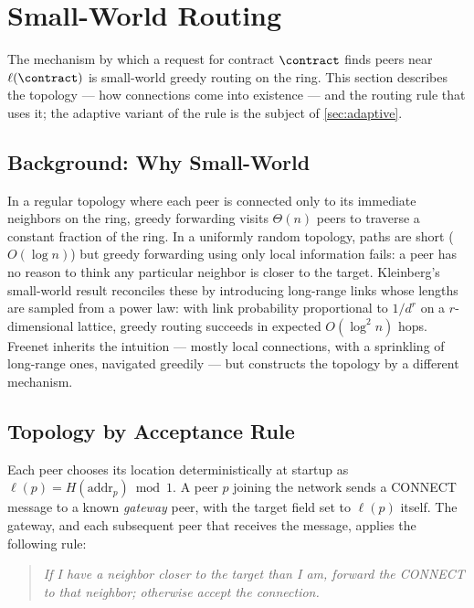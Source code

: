 \section{Small-World Routing}
\label{sec:smallworld}

The mechanism by which a request for contract $\contract$ finds peers near $\ell(\contract)$ is small-world greedy routing on the ring. This section describes the topology --- how connections come into existence --- and the routing rule that uses it; the adaptive variant of the rule is the subject of \cref{sec:adaptive}.

\subsection{Background: Why Small-World}

In a regular topology where each peer is connected only to its immediate neighbors on the ring, greedy forwarding visits $\Theta(n)$ peers to traverse a constant fraction of the ring. In a uniformly random topology, paths are short ($O(\log n)$) but greedy forwarding using only local information fails: a peer has no reason to think any particular neighbor is closer to the target. Kleinberg's small-world result \citep{kleinberg2000small} reconciles these by introducing long-range links whose lengths are sampled from a power law: with link probability proportional to $1/d^{r}$ on a $r$-dimensional lattice, greedy routing succeeds in expected $O(\log^2 n)$ hops. Freenet inherits the intuition --- mostly local connections, with a sprinkling of long-range ones, navigated greedily --- but constructs the topology by a different mechanism.

\subsection{Topology by Acceptance Rule}

Each peer chooses its location deterministically at startup as $\ell(p) = H(\mathrm{addr}_p) \bmod 1$. A peer $p$ joining the network sends a \textsf{CONNECT} message to a known \emph{gateway} peer, with the target field set to $\ell(p)$ itself. The gateway, and each subsequent peer that receives the message, applies the following rule:

\begin{quote}
\emph{If I have a neighbor closer to the target than I am, forward the \textsf{CONNECT} to that neighbor; otherwise accept the connection.}
\end{quote}

